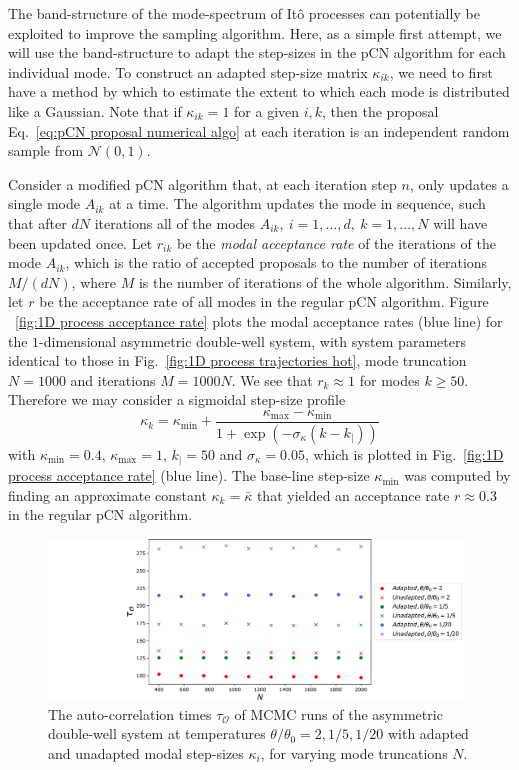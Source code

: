 The band-structure of the mode-spectrum of It\^{o} processes can potentially be exploited to improve the sampling algorithm. Here, as a simple first attempt, we will use the band-structure to adapt the step-sizes in the pCN algorithm for each individual mode. To construct an adapted step-size matrix $\kappa_{ik}$, we need to first have a method by which to estimate the extent to which each mode is distributed like a Gaussian. Note that if $\kappa_{ik} = 1$ for a given $i,k$, then the proposal Eq.~\ref{eq:pCN proposal numerical algo} at each iteration is an independent random sample from $\mathcal{N}(0,1)$.

Consider a modified pCN algorithm that, at each iteration step $n$, only updates a single mode $A_{ik}$ at a time. The algorithm updates the mode in sequence, such that after $d N$ iterations all of the modes $A_{ik},\ i=1,\dots,d,\ k=1,\dots,N$ will have been updated once. Let $r_{ik}$ be the \textit{modal acceptance rate} of the iterations of the mode $A_{ik}$, which is the ratio of accepted proposals to the number of iterations $M/(dN)$, where $M$ is the number of iterations of the whole algorithm. Similarly, let $r$ be the acceptance rate of all modes in the regular pCN algorithm. Figure ~\ref{fig:1D process acceptance rate} plots the modal acceptance rates (blue line) for the $1$-dimensional asymmetric double-well system, with system parameters identical to those in Fig.~\ref{fig:1D process trajectories hot}, mode truncation $N = 1000$ and iterations $M = 1000N$. We see that $r_k \approx 1$ for modes $k \geq 50$. Therefore we may consider a sigmoidal step-size profile
\begin{equation} \label{eq:kappa profile}
	\kappa_k = \kappa_\text{min} + \frac{\kappa_\text{max} - \kappa_\text{min}}{1 + \exp\left( - \sigma_\kappa ( k - k_|) \right)}
\end{equation}
with $\kappa_\text{min} = 0.4$, $\kappa_\text{max}=1$, $k_| = 50$ and $\sigma_\kappa = 0.05$, which is plotted in Fig.~\ref{fig:1D process acceptance rate} (blue line). The base-line step-size $\kappa_\text{min}$ was computed by finding an approximate constant $\kappa_{k} = \bar{\kappa}$ that yielded an acceptance rate $r \approx 0.3$ in the regular pCN algorithm.

\begin{figure}[t]
\includegraphics[width=0.98\textwidth]{figs_part1/mcmc/autocorrelation_benchmarks}
\centering \caption{ The auto-correlation times $\tau_{\mathcal{O}}$ of MCMC runs of the asymmetric double-well system at temperatures $\theta/\theta_0 = 2, 1/5,1/20$ with adapted and unadapted modal step-sizes $\kappa_i$, for varying mode truncations $N$.}
\label{fig:1D autocorrelation benchmarks} 
\end{figure}

